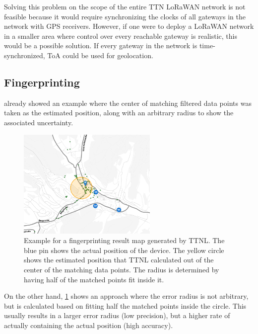 Solving this problem on the scope of the entire \ac{TTN} \ac{LoRaWAN} network is not feasible because it would require synchronizing the clocks of all gateways in the network with \ac{GPS} receivers.
However, if one were to deploy a \ac{LoRaWAN} network in a smaller area where control over every reachable gateway is realistic, this would be a possible solution.
If every gateway in the network is time-synchronized, \ac{ToA} could be used for geolocation.

\subsection{Fingerprinting}


 already showed an example where the center of matching filtered data points was taken as the estimated position, along with an arbitrary radius to show the associated uncertainty.

\begin{figure}[htbp]
    \centering
    \includegraphics[width=0.6\textwidth]{pictures/ttn-locator/frontend/fingerprinting/rssi_similarity_map_example_dynamic_radius.png}
    \caption{
        Example for a fingerprinting result map generated by \ac{TTNL}.
        The blue pin shows the actual position of the device.
        The yellow circle shows the estimated position that \ac{TTNL} calculated out of the center of the matching data points.
        The radius is determined by having half of the matched points fit inside it.
    }\label{fig:fingerprinting-map-example-dynamic-radius}
\end{figure}

On the other hand, \cref{fig:fingerprinting-map-example-dynamic-radius} shows an approach where the error radius is not arbitrary, but is calculated based on fitting half the matched points inside the circle.
This usually results in a larger error radius (low precision), but a higher rate of actually containing the actual position (high accuracy).

